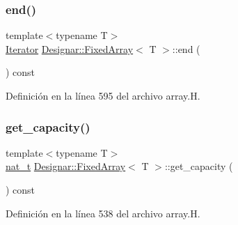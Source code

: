 \subsubsection{\texorpdfstring{end()}{end()}\hspace{0.1cm}{\footnotesize\ttfamily [2/2]}}
{\footnotesize\ttfamily template$<$typename T$>$ \\
\hyperlink{class_designar_1_1_fixed_array_1_1_iterator}{Iterator} \hyperlink{class_designar_1_1_fixed_array}{Designar\+::\+Fixed\+Array}$<$ T $>$\+::end (\begin{DoxyParamCaption}{ }\end{DoxyParamCaption}) const\hspace{0.3cm}{\ttfamily [inline]}}



Definición en la línea 595 del archivo array.\+H.

\mbox{\label{class_designar_1_1_fixed_array_ac262a6be77640c4da26cd49fe9b90db0}} 
\subsubsection{\texorpdfstring{get\+\_\+capacity()}{get\_capacity()}}
{\footnotesize\ttfamily template$<$typename T$>$ \\
\hyperlink{namespace_designar_aa72662848b9f4815e7bf31a7cf3e33d1}{nat\+\_\+t} \hyperlink{class_designar_1_1_fixed_array}{Designar\+::\+Fixed\+Array}$<$ T $>$\+::get\+\_\+capacity (\begin{DoxyParamCaption}{ }\end{DoxyParamCaption}) const\hspace{0.3cm}{\ttfamily [inline]}}



Definición en la línea 538 del archivo array.\+H.

\mbox{\label{class_designar_1_1_fixed_array_af1c7e826a704015eab8f3accac7ead7d}} 
